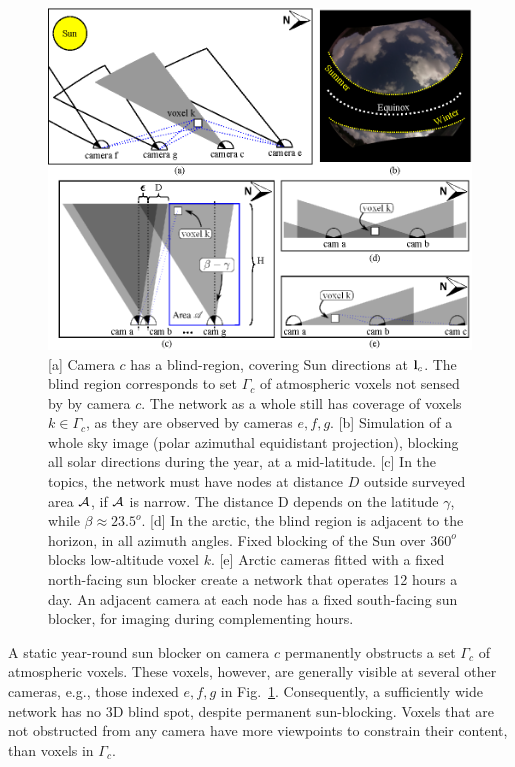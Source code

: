 \documentclass[runningheads]{llncs}
\begin{document}
\begin{figure}[t!]
\begin{center}
   \includegraphics[width=0.8\linewidth]{figures/sun_blocks2_arrow.eps}
\end{center}
   \vspace{-0.6cm}
   \caption{[a] Camera $c$ has a blind-region, covering Sun directions at ${\bf l}_c$. The blind region corresponds to set $\Gamma_c$ of atmospheric voxels not sensed by by camera $c$. The network as a whole still has coverage of voxels $k\in\Gamma_c$, as they are observed by cameras $e,f,g$.
   [b] Simulation of a whole sky image (polar azimuthal equidistant projection), blocking
   all solar directions during the year, at a mid-latitude.
   [c] In the topics, the network must have nodes at distance $D$ outside surveyed area ${\cal A}$, if ${\cal A}$ is narrow.  The distance D depends on the latitude $\gamma$, while
   $\beta\approx23.5^o$.
   [d] In the arctic, the blind region is adjacent to the horizon, in all azimuth angles. Fixed blocking of the Sun over $360^o$  blocks low-altitude voxel $k$. [e] Arctic cameras fitted with a fixed north-facing sun blocker create a network   that operates 12 hours a day. An adjacent camera at each node has a fixed south-facing sun blocker, for imaging during complementing hours.
   }
\label{fig:blindspot}
\end{figure}


A static year-round sun blocker on camera $c$ permanently obstructs a set $\Gamma_c$ of atmospheric voxels. These voxels, however, are generally visible at several other cameras, e.g., those indexed $e,f,g$ in Fig.~\ref{fig:blindspot}. Consequently, a sufficiently wide network has no 3D blind spot, despite permanent sun-blocking. Voxels that are not obstructed from any camera have more viewpoints to constrain their content, than voxels in $\Gamma_c$.
\end{document}
